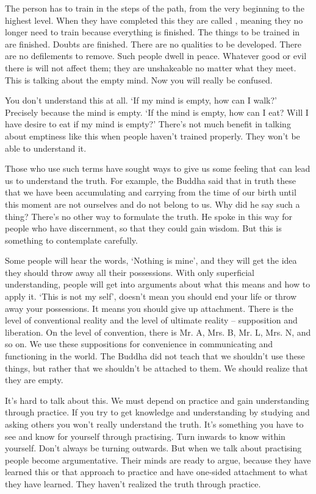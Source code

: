The  person has to train in the steps of the path, from the very beginning to the highest level. When they have completed this they are called , meaning they no longer need to train because everything is finished. The things to be trained in are finished. Doubts are finished. There are no qualities to be developed. There are no defilements to remove. Such people dwell in peace. Whatever good or evil there is will not affect them; they are unshakeable no matter what they meet. This is talking about the empty mind. Now you will really be confused.

You don't understand this at all. `If my mind is empty, how can I walk?' Precisely because the mind is empty. `If the mind is empty, how can I eat? Will I have desire to eat if my mind is empty?' There's not much benefit in talking about emptiness like this when people haven't trained properly. They won't be able to understand it.

Those who use such terms have sought ways to give us some feeling that can lead us to understand the truth. For example, the Buddha said that in truth these  that we have been accumulating and carrying from the time of our birth until this moment are not ourselves and do not belong to us. Why did he say such a thing? There's no other way to formulate the truth. He spoke in this way for people who have discernment, so that they could gain wisdom. But this is something to contemplate carefully.

Some people will hear the words, `Nothing is mine', and they will get the idea they should throw away all their possessions. With only superficial understanding, people will get into arguments about what this means and how to apply it. `This is not my self', doesn't mean you should end your life or throw away your possessions. It means you should give up attachment. There is the level of conventional reality and the level of ultimate reality -- supposition and liberation. On the level of convention, there is Mr. A, Mrs. B, Mr. L, Mrs. N, and so on. We use these suppositions for convenience in communicating and functioning in the world. The Buddha did not teach that we shouldn't use these things, but rather that we shouldn't be attached to them. We should realize that they are empty.

It's hard to talk about this. We must depend on practice and gain understanding through practice. If you try to get knowledge and understanding by studying and asking others you won't really understand the truth. It's something you have to see and know for yourself through practising. Turn inwards to know within yourself. Don't always be turning outwards. But when we talk about practising people become argumentative. Their minds are ready to argue, because they have learned this or that approach to practice and have one-sided attachment to what they have learned. They haven't realized the truth through practice.

